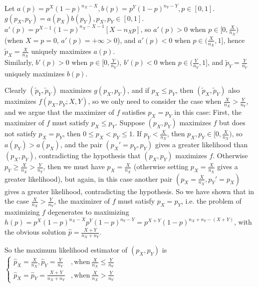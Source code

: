 Let
$
a(p) = 
 p^{X} (1-p)^{n_X - X},
b(p) =
 p^{Y} (1-p)^{n_Y - Y},
p \in [0, 1]
$.
$
g(p_X, p_Y) = a(p_X) b(p_Y),
p_X, p_Y \in [0, 1]
$.
\\
$
a'(p) = p^{X-1}(1-p)^{n_X-X-1}[X - n_X p]
$,
so $a'(p) > 0$ when $p \in [0, \frac{X}{n_X})$
(when $X=p=0$, $a'(p)=+\infty>0$),
and $a'(p) < 0$ when $p \in (\frac{X}{n_X}, 1]$,
hence $\tilde{p}_X=\frac{X}{n_X}$ uniquely maximizes $a(p)$.
\\
Similarly,
$b'(p) > 0$ when $p \in [0, \frac{Y}{n_Y})$,
$b'(p) < 0$ when $p \in (\frac{Y}{n_Y}, 1]$,
and $\tilde{p}_Y=\frac{Y}{n_Y}$ uniquely maximizes $b(p)$.

Clearly 
$(\tilde{p}_Y, \tilde{p}_Y)$ maximizes $g(p_X, p_Y)$,
and if
$p_X \leq p_Y$, then $(\tilde{p}_X, \tilde{p}_Y)$ also maximizes $f(p_X, p_Y; X, Y)$,
so we only need to consider the case when $\frac{X}{n_X} > \frac{Y}{n_Y}$,
and we argue that the maximizer of $f$ satisfies $p_X = p_Y$ in this case:
First, the maximizer of $f$ must satisfy $p_X \leq p_Y$.
Suppose $(p_X, p_Y)$ maximizes $f$ but does not satisfy $p_X=p_Y$, then $0 \leq p_X < p_Y \leq 1$.
If $p_Y < \frac{X}{n_X}$, then $p_X, p_Y \in [0, \frac{X}{n_X})$, so $a(p_Y) > a(p_X)$, and the pair $(p_X'=p_Y, p_Y)$ gives a greater likelihood than $(p_X, p_Y)$, contradicting the hypothesis that $(p_X, p_Y)$ maximizes $f$.
Otherwise $p_Y \geq \frac{X}{n_X} > \frac{Y}{n_Y}$, then we must have
$p_X = \frac{X}{n_X}$ (otherwise setting $p_X = \frac{X}{n_X}$ gives a greater likelihood), but again, in this case another pair $(p_X=\frac{X}{n_X}, p_Y'=p_X)$ gives a greater likelihood, contradicting the hypothesis.
So we have shown that in the case $\frac{X}{n_X} > \frac{Y}{n_Y}$, the maximizer of $f$ must satisfy $p_X=p_Y$, i.e. the problem of maximizing $f$ degenerates to maximizing
$h(p) = p^{X}(1-p)^{n_X-X} p^{Y} (1-p)^{n_Y-Y} = p^{X+Y} (1-p)^{n_X+n_Y-(X+Y)}$, with the obvious solution $\hat{p} = \frac{X+Y}{n_X+n_Y}$.

So the maximum likelihood estimator of $(p_X, p_Y)$ is
$
\left\{\begin{array}{cc}
\hat{p}_X = \frac{X}{n_X}, \hat{p}_Y = \frac{Y}{n_Y} & , \mathrm{when ~} \frac{X}{n_X} \leq \frac{Y}{n_Y}
\\
\hat{p}_X = \hat{p}_Y = \frac{X+Y}{n_X+n_Y} & , \mathrm{when ~} \frac{X}{n_X} > \frac{Y}{n_Y}
\end{array}\right.
$

